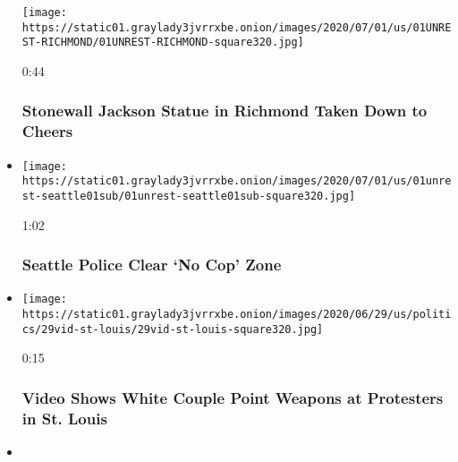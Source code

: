 \begin{itemize}
  \texttt{[image: https://static01.graylady3jvrrxbe.onion/images/2020/07/01/us/01UNREST-RICHMOND/01UNREST-RICHMOND-square320.jpg]}

  0:44

  \hypertarget{stonewall-jackson-statue-in-richmond-taken-down-to-cheers}{%
  \subsubsection{Stonewall Jackson Statue in Richmond Taken Down to
  Cheers}\label{stonewall-jackson-statue-in-richmond-taken-down-to-cheers}}
\item
  \href{https://www.nytimes3xbfgragh.onion/video/us/politics/100000007218978/seattle-police-autonomous-zone.html?action=click\&module=video-series-bar\&region=header\&pgtype=Article\&playlistId=video/minneapolis-george-floyd-death-video}{}

  \texttt{[image: https://static01.graylady3jvrrxbe.onion/images/2020/07/01/us/01unrest-seattle01sub/01unrest-seattle01sub-square320.jpg]}

  1:02

  \hypertarget{seattle-police-clear-no-cop-zone}{%
  \subsubsection{Seattle Police Clear `No Cop'
  Zone}\label{seattle-police-clear-no-cop-zone}}
\item
  \href{https://www.nytimes3xbfgragh.onion/video/us/politics/100000007214585/trump-white-couple-guns-st-louis.html?action=click\&module=video-series-bar\&region=header\&pgtype=Article\&playlistId=video/minneapolis-george-floyd-death-video}{}

  \texttt{[image: https://static01.graylady3jvrrxbe.onion/images/2020/06/29/us/politics/29vid-st-louis/29vid-st-louis-square320.jpg]}

  0:15

  \hypertarget{video-shows-white-couple-point-weapons-at-protesters-in-st-louis}{%
  \subsubsection{Video Shows White Couple Point Weapons at Protesters in
  St.
  Louis}\label{video-shows-white-couple-point-weapons-at-protesters-in-st-louis}}
\item
  \href{https://www.nytimes3xbfgragh.onion/video/us/100000007214015/louisville-shooting-press-briefing.html?action=click\&module=video-series-bar\&region=header\&pgtype=Article\&playlistId=video/minneapolis-george-floyd-death-video}{}


\end{itemize}
